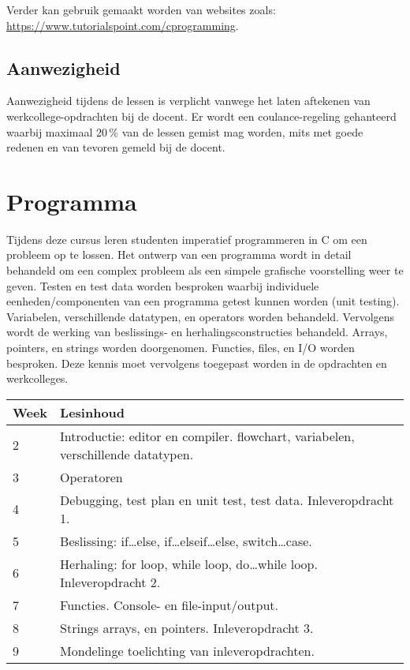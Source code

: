 \documentclass{cursushandleiding}
\begin{document}
Verder kan gebruik gemaakt worden van websites zoals: \url{https://www.tutorialspoint.com/cprogramming}.
%
\subsection{Aanwezigheid}
%
Aanwezigheid tijdens de lessen is verplicht vanwege het laten aftekenen van 
werkcollege-opdrachten bij de docent. Er wordt een coulance-regeling gehanteerd waarbij maximaal 20\,\% van de lessen gemist mag worden, mits met goede redenen en van tevoren gemeld bij de docent. 
%
%
\section{Programma}
Tijdens deze cursus leren studenten imperatief programmeren in C om een probleem op te lossen.
Het ontwerp van een programma wordt in detail behandeld om een complex probleem als een simpele grafische voorstelling weer te geven. Testen en test data worden besproken waarbij individuele eenheden/componenten van een programma getest kunnen worden (unit testing).
Variabelen, verschillende datatypen, en operators worden behandeld. Vervolgens wordt de werking van beslissings- en herhalingsconstructies behandeld. Arrays, pointers, en strings worden doorgenomen. Functies, files, en I/O worden besproken.
Deze kennis moet vervolgens toegepast worden in de opdrachten en werkcolleges.
\newline\newline
%
\begin{tabular}{lp{10cm}}
\hline
\textbf{Week} & \textbf{Lesinhoud}\\
\hline
2 & Introductie: editor en compiler.\newline
flowchart, variabelen, verschillende datatypen.\\
\hline
3 & Operatoren\\
\hline
4 & Debugging, test plan en unit test, test data.\newline
Inleveropdracht 1.\\
\hline
5 & Beslissing:\newline
if\dots else, if\dots elseif\dots else, switch\dots case.\\
\hline
6 & Herhaling:\newline
for loop, while loop, do\dots while loop.\newline
Inleveropdracht 2.\\
\hline
7 & Functies.\newline
Console- en file-input/output.\\
\hline
8 & Strings arrays, en pointers.\newline
Inleveropdracht 3.\\
\hline
9 & Mondelinge toelichting van inleveropdrachten.\\
\hline
\end{tabular}
\end{document}
